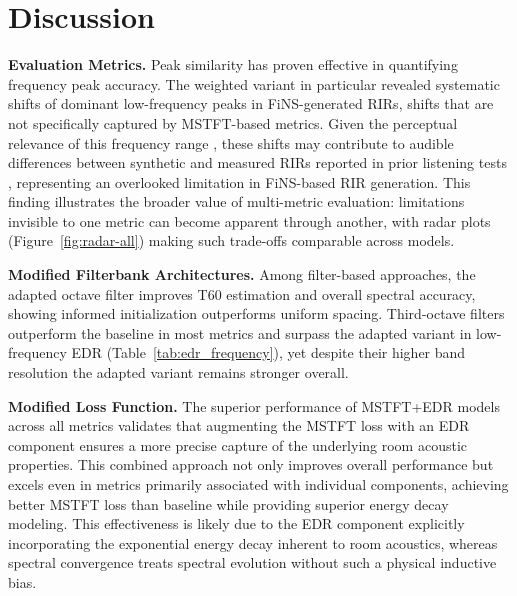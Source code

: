 \documentclass[conference]{IEEEtran}
\begin{document}
 
\section{Discussion}
 
\textbf{Evaluation Metrics.} Peak similarity has proven effective in quantifying frequency peak accuracy. The weighted variant in particular revealed systematic shifts of dominant low-frequency peaks in FiNS-generated RIRs, shifts that are not specifically captured by MSTFT-based metrics. Given the perceptual relevance of this frequency range \cite{fazenda2015}, these shifts may contribute to audible differences between synthetic and measured RIRs reported in prior listening tests \cite{steinmetz2021filtered}, representing an overlooked limitation in FiNS-based RIR generation. This finding illustrates the broader value of multi-metric evaluation: limitations invisible to one metric can become apparent through another, with radar plots (Figure~\ref{fig:radar-all}) making such trade-offs comparable across models.
 
\textbf{Modified Filterbank Architectures.} Among filter-based approaches, the adapted octave filter improves T60 estimation and overall spectral accuracy, showing informed initialization outperforms uniform spacing. Third-octave filters outperform the baseline in most metrics and surpass the adapted variant in low-frequency EDR (Table~\ref{tab:edr_frequency}), yet despite their higher band resolution the adapted variant remains stronger overall.
 
 
\textbf{Modified Loss Function.} The superior performance of MSTFT+\linebreak[2]EDR models across all metrics validates that augmenting the MSTFT loss with an EDR component ensures a more precise capture of the underlying room acoustic properties. This combined approach not only improves overall performance but excels even in metrics primarily associated with individual components, achieving better MSTFT loss than baseline while providing superior energy decay modeling. This effectiveness is likely due to the EDR component explicitly incorporating the exponential energy decay inherent to room acoustics, whereas spectral convergence treats spectral evolution without such a physical inductive bias.
 
\end{document}
